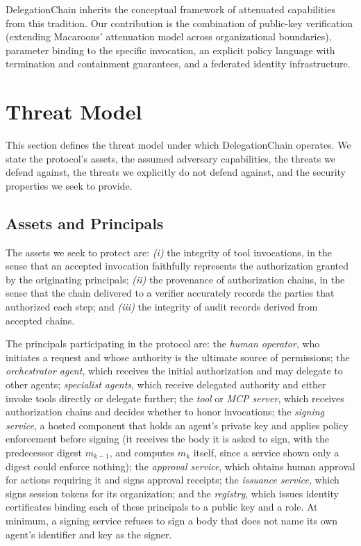 \documentclass[11pt,a4paper]{article}
\begin{document}
DelegationChain inherits the conceptual framework of attenuated
capabilities from this tradition. Our contribution is the combination of
public-key verification (extending Macaroons' attenuation model across
organizational boundaries), parameter binding to the specific
invocation, an explicit policy language with
termination and containment guarantees, and a federated identity
infrastructure.

\section{Threat Model}
\label{sec:threat-model}

This section defines the threat model under which DelegationChain operates.
We state the protocol's assets, the assumed adversary capabilities, the
threats we defend against, the threats we explicitly do not defend against,
and the security properties we seek to provide.

\subsection{Assets and Principals}
\label{sec:threat-assets}

The assets we seek to protect are: \emph{(i)} the integrity of tool
invocations, in the sense that an accepted invocation faithfully
represents the authorization granted by the originating principals;
\emph{(ii)} the provenance of authorization chains, in the sense that the
chain delivered to a verifier accurately records the parties that authorized
each step; and \emph{(iii)} the integrity of audit records derived from
accepted chains.

The principals participating in the protocol are: the \emph{human operator},
who initiates a request and whose authority is the ultimate source of
permissions; the \emph{orchestrator agent}, which receives the initial
authorization and may delegate to other agents; \emph{specialist agents},
which receive delegated authority and either invoke tools directly or
delegate further; the \emph{tool} or \emph{MCP server}, which receives
authorization chains and decides whether to honor invocations; the
\emph{signing service}, a hosted component that holds an agent's private
key and applies policy enforcement before signing (it receives the body
it is asked to sign, with the predecessor digest $m_{k-1}$, and computes
$m_k$ itself, since a service shown only a digest could enforce
nothing); the \emph{approval service}, which obtains human approval for
actions requiring it and signs approval receipts; the \emph{issuance
service}, which signs session tokens for its organization; and the
\emph{registry}, which issues identity certificates binding each of these
principals to a public key and a role. At minimum, a signing service
refuses to sign a body that does not name its own agent's identifier and
key as the signer.
\end{document}

